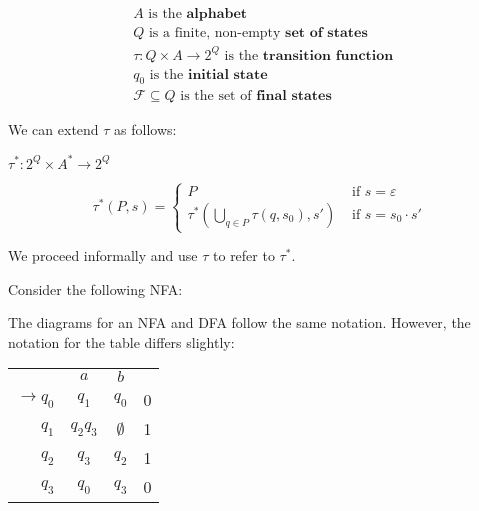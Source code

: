 \begin{align*}
    &A\text{ is the }\textbf{alphabet}\\
    &Q\text{ is a finite, non-empty }\textbf{set of states}\\
    &\tau:Q\times A\to 2^Q\text{ is the }\textbf{transition function }\\
    &q_0\text{ is the }\textbf{initial state}\\
    &\mathcal{F}\subseteq Q\text{ is the set of }\textbf{final states}
\end{align*}

We can extend \(\tau \) as follows: 

\(\tau^*:2^Q\times A^*\to 2^Q\)

\[\tau^*(P, s) = \begin{cases} P &\mbox{ if } s=\varepsilon \\
                             \tau^*\left(\displaystyle\bigcup_{q\in P}\tau(q, s_0), s'\right) &\mbox{ if } s=s_0\cdot s'\end{cases}\]

We proceed informally and use \(\tau \) to refer to \(\tau^*\). 

Consider the following NFA\@:

\begin{center}
\end{center}

The diagrams for an NFA and DFA follow the same notation. However, the notation for the table differs slightly:

\begin{center}\begin{tabular}{r c c r}
         & \(a\) & \(b\) & \\\cmidrule{2-3}
    \(\to q_0\) & \(q_1\) & \(q_0\) & 0 \\
    \(q_1\) & \(q_2q_3\) & \(\emptyset \) & 1 \\
    \(q_2\) & \(q_3\) & \(q_2\) & 1\\
    \(q_3\) & \(q_0\) & \(q_3\) & 0\\
\end{tabular}\end{center}

